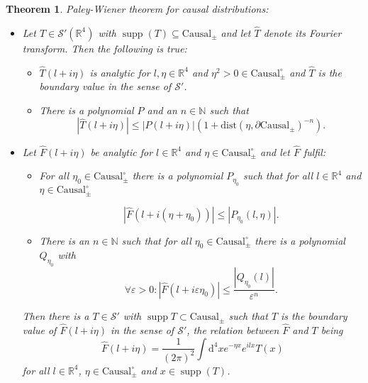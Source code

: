 \documentclass[b5paper,draft,openbib,12pt]{memoir}
\newtheorem{Thm}[Def]{Theorem}
\DeclareMathOperator{\supp}{supp}
\begin{document}
\begin{Thm}\label{Paley-Wiener} Paley-Wiener theorem for causal distributions:
\begin{itemize}

\item[(A)] Let \(T\in \mathcal{S}'(\mathbb{R}^4)\) with \(\supp (T) \subseteq \text{Causal}_{\pm}\) and let \(\hat{T}\) denote its Fourier transform. Then the following is true:
\begin{itemize}
\item[(i)] \(\hat{T}(l+i\eta)\) is analytic for \(l, \eta\in\mathbb{R}^4\) and \(\eta^2>0 \in \text{Causal}^\circ_{\pm}\) and \(\hat{T}\) is the boundary value in the sense of \(\mathcal{S}'\).
\item[(ii)] There is a polynomial \(P\) and an \(n\in\mathbb{N}\) such that
\begin{equation}
\left| \hat{T}(l+i\eta) \right|\le \left| P(l+i\eta )\right| (1+ \text{dist}(\eta, \partial \text{Causal}_{\pm})^{-n}).
\end{equation}
\end{itemize}
\item[(B)] Let \(\hat{F}(l+i\eta)\) be analytic for \(l\in\mathbb{R}^4\) and \(\eta\in\text{Causal}^\circ_{\pm}\) and let \(\hat{F}\) fulfil:
\begin{itemize}
\item[(i)] For all \(\eta_0\in \text{Causal}^\circ_{\pm}\) there is a polynomial \(P_{\eta_0}\) such that for all \(l\in\mathbb{R}^4\) and \(\eta \in \text{Causal}^\circ_{\pm}\)

\begin{equation}
|\hat{F}(l+i(\eta + \eta_0))|\le | P_{\eta_0}(l,\eta)|.
\end{equation}

\item[(ii)] There is an \(n\in\mathbb{N}\) such that for all \(\eta_0\in\text{Causal}^\circ_{\pm}\) there is a polynomial \(Q_{\eta_0}\) with 
\begin{equation}
\forall \varepsilon>0: |\hat{F}(l+i \varepsilon\eta_0)|\le \frac{ | Q_{\eta_0}(l)|}{\varepsilon^n}.
\end{equation}
\end{itemize}
Then there is a \(T\in \mathcal{S}'\) with \(\supp T\subset \text{Causal}_{\pm}\) such that \(T\) is the boundary value of \(\hat{F}(l+i\eta)\) in the sense of \(\mathcal{S}'\), the relation between \(\hat{F}\) and \(T\) being
\begin{equation}
\hat{F}(l+i \eta)= \frac{1}{(2\pi)^2} \int \mathrm{d}^4x e^{-\eta x} e^{i l x} T(x)
\end{equation}
for all \(l\in\mathbb{R}^4\), \(\eta \in \text{Causal}^\circ_{\pm}\) and \(x\in \supp (T)\).
\end{itemize}
\end{Thm}
\end{document}

